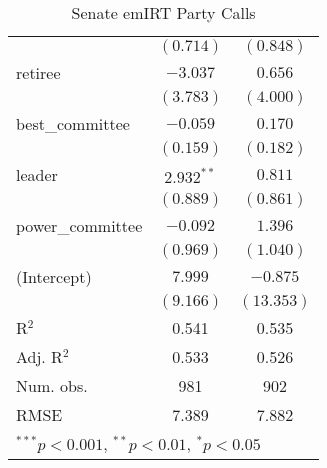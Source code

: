 \documentclass[12pt]{article}
\begin{document}
\begin{table}
\begin{center}
\begin{tabular}{l c c }
			& $(0.714)$     & $(0.848)$     \\
			retiree                       & $-3.037$      & $0.656$       \\
			& $(3.783)$     & $(4.000)$     \\
			best\_committee               & $-0.059$      & $0.170$       \\
			& $(0.159)$     & $(0.182)$     \\
			leader                        & $2.932^{**}$  & $0.811$       \\
			& $(0.889)$     & $(0.861)$     \\
			power\_committee              & $-0.092$      & $1.396$       \\
			& $(0.969)$     & $(1.040)$     \\
			(Intercept)                   & $7.999$       & $-0.875$      \\
			& $(9.166)$     & $(13.353)$    \\
			\hline
			R$^2$                         & 0.541         & 0.535         \\
			Adj. R$^2$                    & 0.533         & 0.526         \\
			Num. obs.                     & 981           & 902           \\
			RMSE                          & 7.389         & 7.882         \\
			\hline
			\multicolumn{3}{l}{\scriptsize{$^{***}p<0.001$, $^{**}p<0.01$, $^*p<0.05$}}
		\end{tabular}
		\caption{Senate emIRT Party Calls}
	\end{center}
\end{table}
\end{document}
